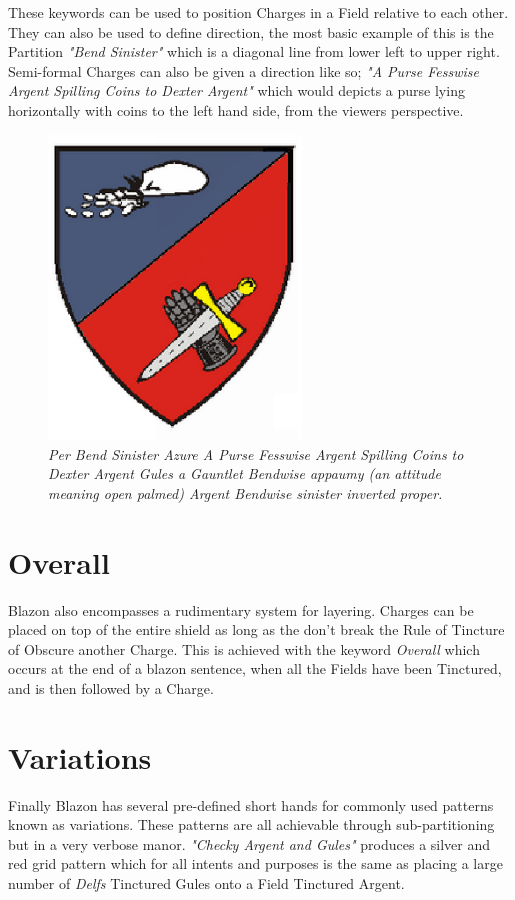 These keywords can be used to position Charges in a Field relative to each other.  They can also be used to define direction, the most basic example of this is the Partition \emph{"Bend Sinister"} which is a diagonal line from lower left to upper right.
Semi-formal Charges can also be given a direction like so; \emph{"A Purse Fesswise Argent Spilling Coins to Dexter Argent"} which would depicts a purse lying horizontally with coins to the left hand side, from the viewers perspective.  

\begin{figure}[H]
  \centering
    \includegraphics[width=0.6\textwidth]{blazon/images/purse.eps}
  \caption{\emph{Per Bend Sinister Azure A Purse Fesswise Argent Spilling Coins to Dexter Argent Gules a Gauntlet Bendwise appaumy (an attitude meaning open palmed) Argent Bendwise sinister inverted proper.}\cite{fessways}}
  
\end{figure}



\section{Overall}
Blazon also encompasses a rudimentary system for layering.  Charges can be placed on top of the entire shield as long as the don't break the Rule of Tincture of Obscure another Charge.  This is achieved with the keyword \emph{Overall} which occurs at the end of a blazon sentence, when all the Fields have been Tinctured, and is then followed by a Charge. 


\section{Variations}
Finally Blazon has several pre-defined short hands for commonly used patterns known as variations.  These patterns are all achievable through sub-partitioning but in a very verbose manor.  \emph{"Checky Argent and Gules"} produces a silver and red grid pattern which for all intents and purposes is the same as placing a large number of \emph{Delfs} Tinctured Gules onto a Field Tinctured Argent. 

